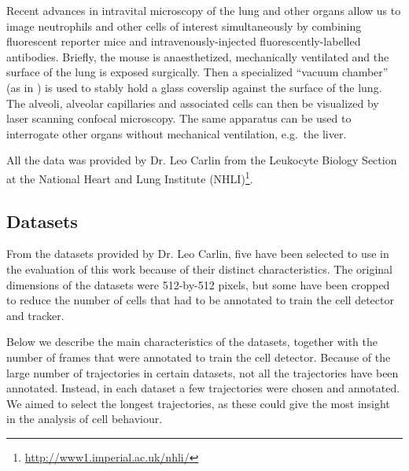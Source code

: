     Recent advances in intravital microscopy of the lung \cite{looney11} and other organs allow us to image neutrophils and other cells of interest simultaneously by combining fluorescent reporter mice and intravenously-injected fluorescently-labelled antibodies. Briefly, the mouse is anaesthetized, mechanically ventilated and the surface of the lung is exposed surgically. Then a specialized ``vacuum chamber'' (as in \cite{looney11}) is used to stably hold a glass coverslip against the surface of the lung. The alveoli, alveolar capillaries and associated cells can then be visualized by laser scanning confocal microscopy. The same apparatus can be used to interrogate other organs without mechanical ventilation, e.g.\ the liver.
        
    All the data was provided by Dr. Leo Carlin from the Leukocyte Biology Section at the National Heart and Lung Institute (NHLI)\footnote{\url{http://www1.imperial.ac.uk/nhli/}}.
    
    \subsection{Datasets \statusseconddraft}
       
	From the datasets provided by Dr. Leo Carlin, five have been selected to use in the evaluation of this work because of their distinct characteristics. The original dimensions of the datasets were 512-by-512 pixels, but some have been cropped to reduce the number of cells that had to be annotated to train the cell detector and tracker.
	
	Below we describe the main characteristics of the datasets, together with the number of frames that were annotated to train the cell detector. Because of the large number of trajectories in certain datasets, not all the trajectories have been annotated. Instead, in each dataset a few trajectories were chosen and annotated. We aimed to select the longest trajectories, as these could give the most insight in the analysis of cell behaviour.
	
